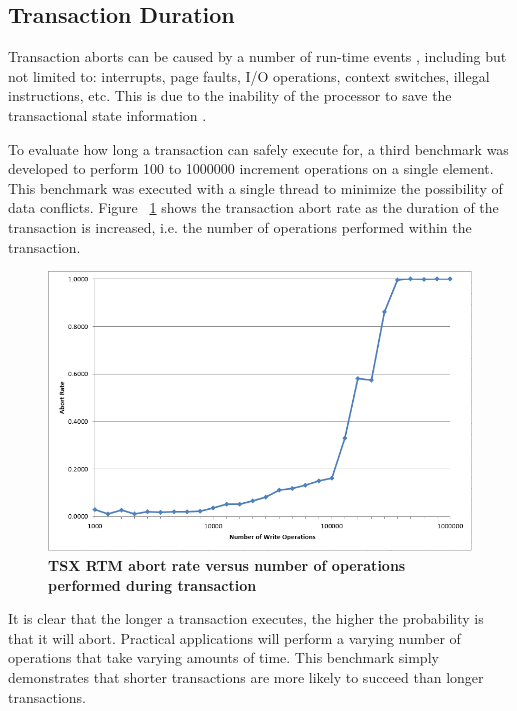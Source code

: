 \documentclass[a4paper]{article}
\begin{document}
\subsection{\textbf{Transaction Duration}}

\indent 
Transaction aborts can be caused by a number of run-time events
\cite{intel_prog_ref}, including but not limited to: interrupts, page faults,
I/O operations, context switches, illegal instructions, etc.  This is due to the
inability of the processor to save the transactional state information
\cite{schwahn}.
\par

\indent
To evaluate how long a transaction can safely execute for, a third
benchmark was developed to perform 100 to 1000000 increment operations on a
single element.  This benchmark was executed with a single thread to minimize
the possibility of data conflicts. Figure ~\ref{fig:trx_duration} shows the
transaction abort rate as the duration of the transaction is increased, i.e. the
number of operations performed within the transaction.
\par

\begin{figure}[H]
    \centering
    \graphicspath{ {./figures/} }
    \includegraphics[width=\textwidth,height=\textheight,keepaspectratio]{trx_duration}
    \caption{\textbf{TSX RTM abort rate versus number of operations performed
    during transaction}}
    \label{fig:trx_duration}
\end{figure}

\indent 
It is clear that the longer a transaction executes, the higher the probability
is that it will abort.  Practical applications will perform a varying number of
operations that take varying amounts of time.  This benchmark simply
demonstrates that shorter transactions are more likely to succeed than longer
transactions.
\par
\end{document}
